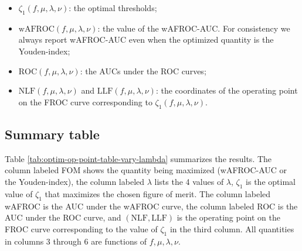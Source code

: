 \documentclass[
]{book}
\begin{document}
\begin{itemize}
\item
  \(\zeta_{1} \left ( f, \mu, \lambda, \nu \right )\): the optimal thresholds;
\item
  \(\text{wAFROC} \left (f, \mu, \lambda, \nu \right )\): the value of the wAFROC-AUC. For consistency we always report wAFROC-AUC even when the optimized quantity is the Youden-index;
\item
  \(\text{ROC} \left (f, \mu, \lambda, \nu \right )\): the AUCs under the ROC curves;
\item
  \(\text{NLF} \left (f, \mu, \lambda, \nu \right )\) and \(\text{LLF} \left (f, \mu, \lambda, \nu \right )\): the coordinates of the operating point on the FROC curve corresponding to \(\zeta_{1} \left ( f, \mu, \lambda, \nu \right )\).
\end{itemize}

\hypertarget{summary-table}{%
\subsection{Summary table}\label{summary-table}}

Table \ref{tab:optim-op-point-table-vary-lambda} summarizes the results. The column labeled FOM shows the quantity being maximized (wAFROC-AUC or the Youden-index), the column labeled \(\lambda\) lists the 4 values of \(\lambda\), \(\zeta_1\) is the optimal value of \(\zeta_1\) that maximizes the chosen figure of merit. The column labeled wAFROC is the AUC under the wAFROC curve, the column labeled ROC is the AUC under the ROC curve, and \(\left( \text{NLF}, \text{LLF}\right)\) is the operating point on the FROC curve corresponding to the value of \(\zeta_1\) in the third column. All quantities in columns 3 through 6 are functions of \(f, \mu, \lambda, \nu\).
\end{document}
